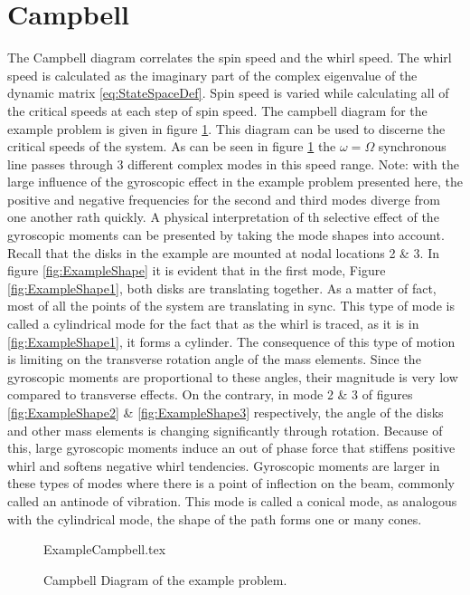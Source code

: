 \section{Campbell}
The Campbell diagram correlates the spin speed and the whirl speed. The whirl speed is calculated as the imaginary part of the complex eigenvalue of the dynamic matrix \eqref{eq:StateSpaceDef}. Spin speed is varied while calculating all of the critical speeds at each step of spin speed. The campbell diagram for the example problem is given in figure \ref{fig:ExampleCampbell}. This diagram can be used to discerne the critical speeds of the system. As can be seen in figure \ref{fig:ExampleCampbell} the $ \omega=\Omega $ synchronous line passes through 3 different complex modes in this speed range. Note: with the large influence of the gyroscopic effect in the example problem presented here, the positive and negative frequencies for the second and third modes diverge from one another rath quickly. A physical interpretation of th selective effect of the gyroscopic moments can be presented by taking the mode shapes into account. Recall that the disks in the example are mounted at nodal locations 2 \& 3. In figure \ref{fig:ExampleShape} it is evident that in the first mode, Figure \ref{fig:ExampleShape1}, both disks are translating together. As a matter of fact, most of all the points of the system are translating in sync. This type of mode is called a cylindrical mode for the fact that as the whirl is traced, as it is in \ref{fig:ExampleShape1}, it forms a cylinder. The consequence of this type of motion is limiting on the transverse rotation angle of the mass elements. Since the gyroscopic moments are proportional to these angles, their magnitude is very low compared to transverse effects. On the contrary, in mode 2 \& 3 of figures \ref{fig:ExampleShape2} \& \ref{fig:ExampleShape3} respectively, the angle of the disks and other mass elements is changing significantly through rotation. Because of this, large gyroscopic moments induce an out of phase force that stiffens positive whirl and softens negative whirl tendencies. Gyroscopic moments are larger in these types of modes where there is a point of inflection on the beam, commonly called an antinode of vibration. This mode is called a conical mode, as analogous with the cylindrical mode, the shape of the path forms one or many cones.\par 
\begin{figure}[!htb]
	\def\width{.7*\linewidth}
	\def\height{.4*\linewidth}
	\def\sep{3em}
	\centering
	{ExampleCampbell.tex}
	\caption{Campbell Diagram of the example problem.}
	\label{fig:ExampleCampbell}
\end{figure}
